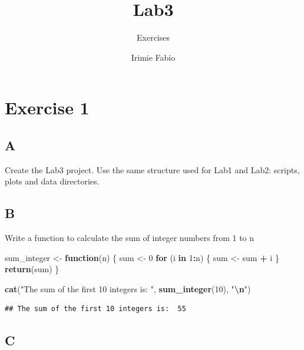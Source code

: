 \documentclass[
]{article}
\title{Lab3}
\subtitle{Exercises}
\author{Irimie Fabio}
\date{}
\newenvironment{Shaded}{\begin{snugshade}}{\end{snugshade}}
\newcommand{\ControlFlowTok}[1]{\textcolor[rgb]{0.13,0.29,0.53}{\textbf{#1}}}
\newcommand{\DecValTok}[1]{\textcolor[rgb]{0.00,0.00,0.81}{#1}}
\newcommand{\FunctionTok}[1]{\textcolor[rgb]{0.13,0.29,0.53}{\textbf{#1}}}
\newcommand{\NormalTok}[1]{#1}
\newcommand{\OtherTok}[1]{\textcolor[rgb]{0.56,0.35,0.01}{#1}}
\newcommand{\SpecialCharTok}[1]{\textcolor[rgb]{0.81,0.36,0.00}{\textbf{#1}}}
\newcommand{\StringTok}[1]{\textcolor[rgb]{0.31,0.60,0.02}{#1}}
\begin{document}
\maketitle

{
\setcounter{tocdepth}{2}
\tableofcontents
}
\hypertarget{exercise-1}{%
\section{Exercise 1}\label{exercise-1}}

\hypertarget{a}{%
\subsection{A}\label{a}}

Create the Lab3 project. Use the same structure used for Lab1 and Lab2:
scripts, plots and data directories.

\hypertarget{b}{%
\subsection{B}\label{b}}

Write a function to calculate the sum of integer numbers from 1 to n

\begin{Shaded}
\begin{Highlighting}[]
\NormalTok{sum\_integer }\OtherTok{\textless{}{-}} \ControlFlowTok{function}\NormalTok{(n) \{}
\NormalTok{  sum }\OtherTok{\textless{}{-}} \DecValTok{0}
  \ControlFlowTok{for}\NormalTok{ (i }\ControlFlowTok{in} \DecValTok{1}\SpecialCharTok{:}\NormalTok{n) \{}
\NormalTok{    sum }\OtherTok{\textless{}{-}}\NormalTok{ sum }\SpecialCharTok{+}\NormalTok{ i}
\NormalTok{  \}}
  \FunctionTok{return}\NormalTok{(sum)}
\NormalTok{\}}

\FunctionTok{cat}\NormalTok{(}\StringTok{"The sum of the first 10 integers is: "}\NormalTok{, }\FunctionTok{sum\_integer}\NormalTok{(}\DecValTok{10}\NormalTok{), }\StringTok{"}\SpecialCharTok{\textbackslash{}n}\StringTok{"}\NormalTok{)}
\end{Highlighting}
\end{Shaded}

\begin{verbatim}
## The sum of the first 10 integers is:  55
\end{verbatim}

\hypertarget{c}{%
\subsection{C}\label{c}}
\end{document}
